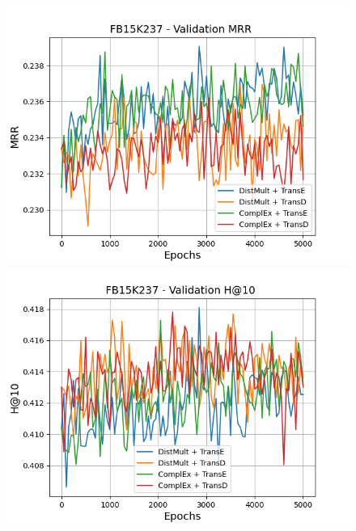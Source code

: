 \begin{figure}
    \centering
    \begin{minipage}{.45\textwidth}
      \centering
      \includegraphics[width=0.9\linewidth]{figures/results/gan_train/pretrained/uncertainty/max_distribution/entropy/fb15k237/5k_epochs/uncertainty_fb15k237_mrrs.png}
    \end{minipage}%
    \begin{minipage}{.45\textwidth}
      \centering
      \includegraphics[width=0.9\linewidth]{figures/results/gan_train/pretrained/uncertainty/max_distribution/entropy/fb15k237/5k_epochs/uncertainty_fb15k237_hit10.png}
    \end{minipage}
    

\end{figure}
